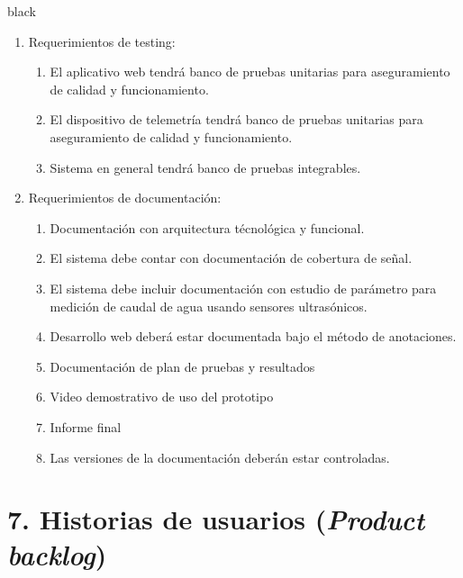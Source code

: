 \documentclass[
11pt, %
codirector, %
]{charter}
\begin{document}
\begin{consigna}{black}
\begin{enumerate}
\item Requerimientos de testing:
	\begin{enumerate}
		\item El aplicativo web tendrá banco de pruebas unitarias para aseguramiento de calidad y funcionamiento.
		\item El dispositivo de telemetría tendrá banco de pruebas unitarias para aseguramiento de calidad y funcionamiento.
		\item Sistema en general tendrá banco de pruebas integrables.
	\end{enumerate}

\item Requerimientos de documentación:
	\begin{enumerate}
		\item Documentación con arquitectura técnológica y funcional.
		\item El sistema debe contar con documentación de cobertura de señal. 
		\item El sistema debe incluir documentación con estudio de parámetro para medición de caudal de agua usando sensores ultrasónicos.
		\item Desarrollo web deberá estar documentada bajo el método de anotaciones.
		\item Documentación de plan de pruebas y resultados
		\item Video demostrativo de uso del prototipo
		\item Informe final
		\item Las versiones de la documentación deberán estar controladas.
	\end{enumerate}

\end{enumerate}

\end{consigna}

\section{7. Historias de usuarios (\textit{Product backlog})}
\label{sec:backlog}
\end{document}
